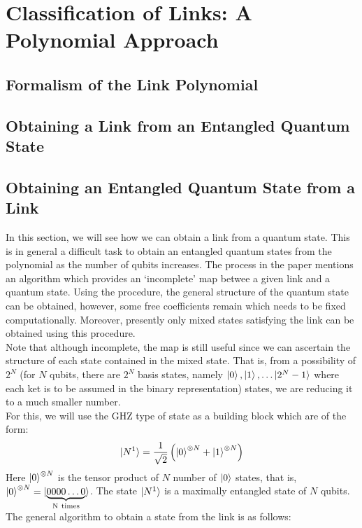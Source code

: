\documentclass{scrartcl}
\begin{document}
\section{Classification of Links: A Polynomial Approach}
\subsection{Formalism of the Link Polynomial}
\subsection{Obtaining a Link from an Entangled Quantum State}\label{link_from_state}

\subsection{Obtaining an Entangled Quantum State from a Link}\label{state_from_link}
In this section, we will see how we can obtain a link from a quantum state. This is in general a difficult task to obtain an entangled quantum states from the polynomial as the number of qubits increases. The process in the paper mentions an algorithm which provides an `incomplete' map betwee a given link and a quantum state. Using the procedure, the general structure of the quantum state can be obtained, however, some free coefficients remain which needs to be fixed computationally. Moreover, presently only mixed states satisfying the link can be obtained using this procedure. \\[0.3cm]
Note that although incomplete, the map is still useful since we can ascertain the structure of each state contained in the mixed state. That is, from a possibility of $2^N$ (for $N$ qubits, there are $2^N$ basis states, namely $\ket{0}, \ket{1}, \ldots \ket{2^N-1}$ where each ket is to be assumed in the binary representation) states, we are reducing it to a much smaller number. \\[0.3cm]
For this, we will use the GHZ type of state as a building block which are of the form:
\begin{align*}
    \ket{N^1} = \frac{1}{\sqrt{2}}\left( \ket{0}^{\otimes N} + \ket{1}^{\otimes N} \right) \\
\end{align*}
Here $\ket{0}^{\otimes N}$ is the tensor product of $N$ number of $\ket{0}$ states, that is, $\ket{0}^{\otimes N} = \ket{\underbrace{0000\ldots0}_{\mathrm{N\ times}}}$. The state $\ket{N^1}$ is a maximally entangled state of $N$ qubits. The general algorithm to obtain a state from the link is as follows:
\end{document}
